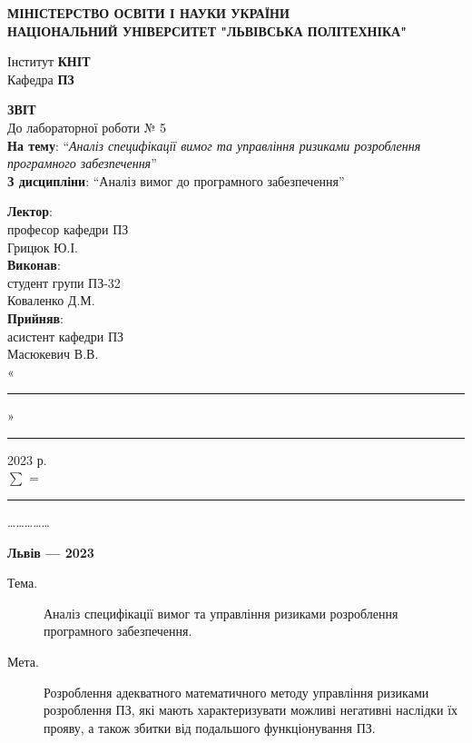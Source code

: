 \documentclass[14pt]{extreport}
\newcommand\subject{Аналіз вимог до програмного забезпечення}
\newcommand\lecturer{професор кафедри ПЗ\\Грицюк Ю.І.}
\newcommand\teacher{асистент кафедри ПЗ\\Масюкевич В.В.}
\newcommand\mygroup{ПЗ-32}
\newcommand\lab{5}
\newcommand\theme{Аналіз специфікації вимог та управління ризиками розроблення програмного забезпечення}
\newcommand\purpose{Розроблення адекватного математичного методу управління ризиками розроблення ПЗ, які мають характеризувати можливі негативні наслідки їх прояву, а також збитки від подальшого функціонування ПЗ}
\begin{document}
\begin{normalsize}
	\begin{titlepage}
		\thispagestyle{empty}
		\begin{center}
			\textbf{МІНІСТЕРСТВО ОСВІТИ І НАУКИ УКРАЇНИ\\
				НАЦІОНАЛЬНИЙ УНІВЕРСИТЕТ "ЛЬВІВСЬКА ПОЛІТЕХНІКА"}
		\end{center}
		\begin{flushright}
			Інститут \textbf{КНІТ}\\
			Кафедра \textbf{ПЗ}
		\end{flushright}
		\vspace{140pt}
		\begin{center}
			\textbf{ЗВІТ}\\
			\vspace{10pt}
			До лабораторної роботи № \lab\\
			\textbf{На тему}: “\textit{\theme}”\\
			\textbf{З дисципліни}: “\subject”
		\end{center}
		\vspace{40pt}
		\begin{flushright}
			
			\textbf{Лектор}:\\
			\lecturer\\
			\vspace{10pt}
			\textbf{Виконав}:\\
			
			студент групи \mygroup\\
			Коваленко Д.М.\\
			\vspace{10pt}
			\textbf{Прийняв}:\\
			
			\teacher\\
			
			\vspace{28pt}
			«\rule{1cm}{0.15mm}» \rule{1.5cm}{0.15mm} 2023 р.\\
			$\sum$ = \rule{1cm}{0.15mm}……………\\
			
		\end{flushright}
		\vspace{\fill}
		\begin{center}
			\textbf{Львів — 2023}
		\end{center}
	\end{titlepage}
		
	\begin{description}
		\item[Тема.] \theme.
		\item[Мета.] \purpose.
	\end{description}


\end{normalsize}
\end{document}
